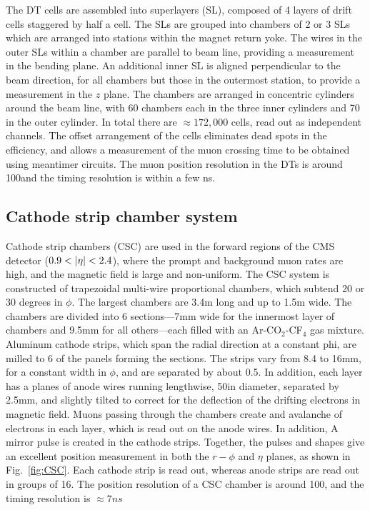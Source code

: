 The DT cells are assembled into superlayers (SL), composed of 
4 layers of drift cells staggered by half a cell. 
The SLs are grouped into chambers of 2 or 3 SLs which are arranged into stations
within the magnet return yoke.
The wires in the outer SLs within a chamber are parallel to beam line, providing
a measurement in the bending plane.
An additional inner SL is aligned perpendicular to the beam direction, 
for all chambers but those in the 
outermost station, to provide a measurement in the $z$ plane. 
The chambers are arranged in concentric cylinders
around the beam line, with 60 chambers each in the three inner cylinders
and 70 in the outer cylinder. In total there are $\approx172,000$ 
cells, read out as independent channels. The offset arrangement of the cells
eliminates dead spots in the efficiency, and allows a measurement of the
muon crossing time to be obtained using meantimer circuits.
The muon position resolution in the DTs is around 100\micron and the
timing resolution is within a few ns.

\subsection{Cathode strip chamber system}

Cathode strip chambers (CSC) are used in
the forward regions of the CMS detector ($0.9 < \lvert \eta \rvert < 2.4$), 
where the prompt and background muon rates are high, and the magnetic field
is large and non-uniform. The CSC system is constructed of trapezoidal
multi-wire proportional chambers,
which subtend 20 or 30 degrees in $\phi$. The largest chambers are 3.4\unit{m}
long and up to 1.5\unit{m} wide. The chambers are divided into 6 sections---7\unit{mm} 
wide for the innermost layer of chambers and 9.5\unit{mm} for all 
others---each filled with an Ar-CO$_2$-CF$_4$ gas mixture. Aluminum cathode strips,
which span the radial direction at a constant phi, 
are milled to 6 of the panels forming the sections. The strips vary from
8.4 to 16\unit{mm}, for a constant width in $\phi$, and are separated by about 0.5\mm. 
In addition, each layer has a planes of anode wires running lengthwise, 
50\micron in diameter, separated by 2.5\unit{mm}, and slightly tilted to correct
for the deflection of the drifting electrons in magnetic field.
Muons passing through the chambers create and avalanche
of electrons in each layer, which is read out on the anode wires. In addition,
A mirror pulse is created in the cathode strips.
Together, the pulses and shapes give an excellent position measurement 
in both the $r-\phi$ and $\eta$ planes, as shown in Fig.~\ref{fig:CSC}.
Each cathode strip is read out, whereas anode strips are read out in
groups of 16. The position resolution of a CSC chamber is around
100\micron, and the timing resolution is $\approx7\unit{ns}$

